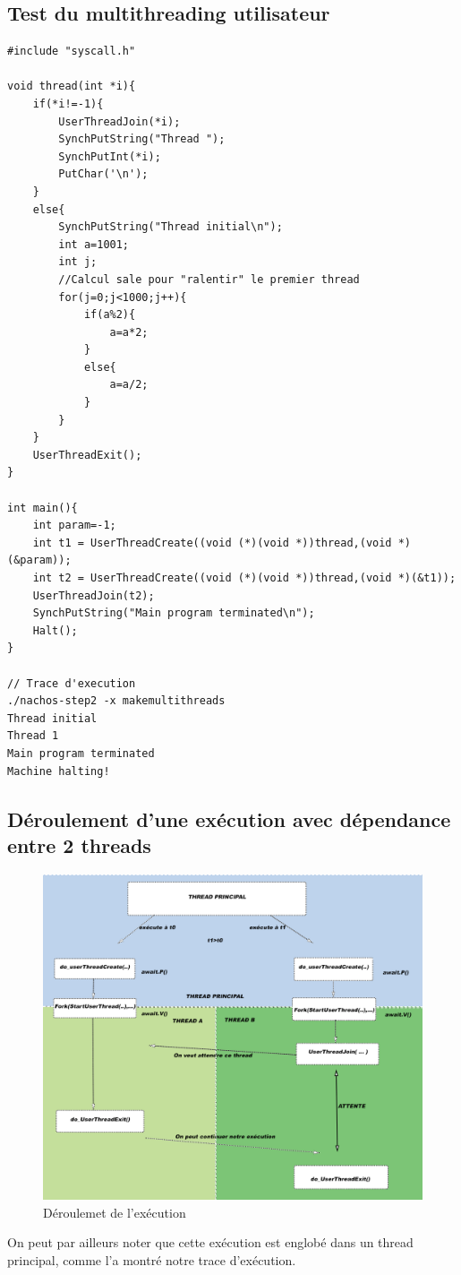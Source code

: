 \documentclass[a4paper,10pt]{article}
\begin{document}
\subsection{Test du multithreading utilisateur}

\begin{lstlisting}[frame=single]
 #include "syscall.h"

void thread(int *i){
	if(*i!=-1){
		UserThreadJoin(*i);
		SynchPutString("Thread ");
		SynchPutInt(*i);
		PutChar('\n');
	}
	else{
		SynchPutString("Thread initial\n");
		int a=1001;
		int j;	
		//Calcul sale pour "ralentir" le premier thread
		for(j=0;j<1000;j++){
			if(a%2){
				a=a*2;
			}
			else{
				a=a/2;
			}
		}
	}
	UserThreadExit();
}

int main(){
	int param=-1;
	int t1 = UserThreadCreate((void (*)(void *))thread,(void *)(&param));
	int t2 = UserThreadCreate((void (*)(void *))thread,(void *)(&t1));
	UserThreadJoin(t2);
	SynchPutString("Main program terminated\n");
	Halt();
}

// Trace d'execution
./nachos-step2 -x makemultithreads
Thread initial
Thread 1
Main program terminated
Machine halting!
\end{lstlisting}
\newpage
\subsection{Déroulement d'une exécution avec dépendance entre 2 threads}
\begin{figure}[h]
  \begin{center}
    \includegraphics[scale=0.39]{./nachos_join.png}
   \caption{\label{join} Déroulemet de l'exécution}
  \end{center}
\end{figure}

On peut par ailleurs noter que cette exécution est englobé dans un thread principal, comme l'a montré notre trace d'exécution.
\end{document}
